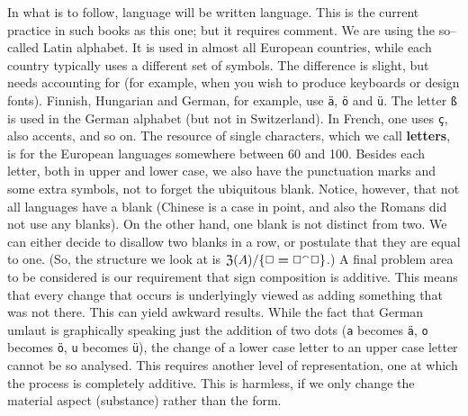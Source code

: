 In what is to follow, language will be written language. This is
the current practice in such books as this one; but it requires 
comment. We are using the so--called Latin alphabet. It is used in 
almost all European countries, while each country typically uses a 
different set of symbols. The difference is slight, but needs 
accounting for (for example, when you wish to produce keyboards 
or design fonts). Finnish, Hungarian and German,
for example, use {\tt \"a}, {\tt \"o} and {\tt \"u}. The letter
{\tt {\ss}} is used in the German alphabet (but not in
Switzerland). In French, 
one uses {\tt \c{c}}, also accents, and
so on. The resource of single characters,
which we call \textbf{letters}, is for the European languages somewhere 
between 60 and 100. Besides each letter, both in upper and lower case,
we also have the punctuation marks and some extra symbols, not to 
forget the ubiquitous blank. Notice, however, that not all languages 
have a blank (Chinese is a case in point, and also the Romans did not 
use any blanks). 
On the other hand, one blank is not distinct from two. We can either 
decide to disallow two blanks in a row, or postulate that they are 
equal to one. (So, the structure we look at is 
$\mathfrak{Z}(A)/\{\Box \boldsymbol{=} \Box{^{\smallfrown}}\Box\}$.) A final problem 
area to be considered is our requirement that sign composition is 
additive. This means that every change that occurs is underlyingly viewed 
as adding something that was not there. This can yield awkward 
results. While the fact that German umlaut is graphically 
speaking just the addition of two dots ({\tt a} becomes {\tt \"a}, 
{\tt o} becomes {\tt \"o}, {\tt u} becomes {\tt \"u}), the change 
of a lower case letter to an upper case letter cannot be so 
analysed. This requires another level of representation, one 
at which the process is completely additive. This is harmless, 
if we only change the material aspect (substance) rather than the 
form. 

